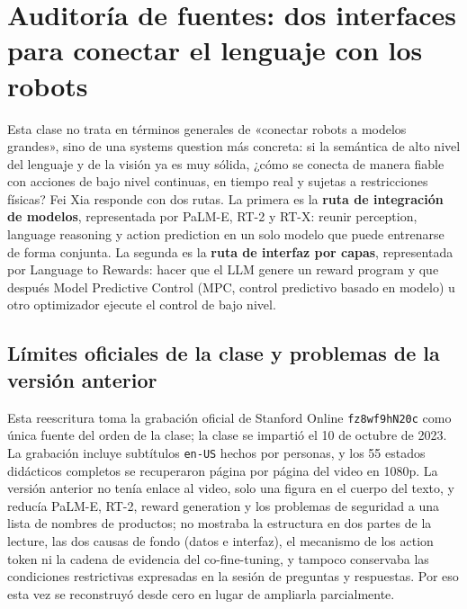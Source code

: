 \section{Auditoría de fuentes: dos interfaces para conectar el lenguaje con los robots}

Esta clase no trata en términos generales de «conectar robots a modelos grandes», sino de una systems question más concreta: si la semántica de alto nivel del lenguaje y de la visión ya es muy sólida, ¿cómo se conecta de manera fiable con acciones de bajo nivel continuas, en tiempo real y sujetas a restricciones físicas? Fei Xia responde con dos rutas. La primera es la \textbf{ruta de integración de modelos}, representada por PaLM-E, RT-2 y RT-X: reunir perception, language reasoning y action prediction en un solo modelo que puede entrenarse de forma conjunta. La segunda es la \textbf{ruta de interfaz por capas}, representada por Language to Rewards: hacer que el LLM genere un reward program y que después Model Predictive Control (MPC, control predictivo basado en modelo) u otro optimizador ejecute el control de bajo nivel.

\subsection{Límites oficiales de la clase y problemas de la versión anterior}

Esta reescritura toma la grabación oficial de Stanford Online \texttt{fz8wf9hN20c} como única fuente del orden de la clase; la clase se impartió el 10 de octubre de 2023. La grabación incluye subtítulos \texttt{en-US} hechos por personas, y los 55 estados didácticos completos se recuperaron página por página del video en 1080p. La versión anterior no tenía enlace al video, solo una figura en el cuerpo del texto, y reducía PaLM-E, RT-2, reward generation y los problemas de seguridad a una lista de nombres de productos; no mostraba la estructura en dos partes de la lecture, las dos causas de fondo (datos e interfaz), el mecanismo de los action token ni la cadena de evidencia del co-fine-tuning, y tampoco conservaba las condiciones restrictivas expresadas en la sesión de preguntas y respuestas. Por eso esta vez se reconstruyó desde cero en lugar de ampliarla parcialmente.

